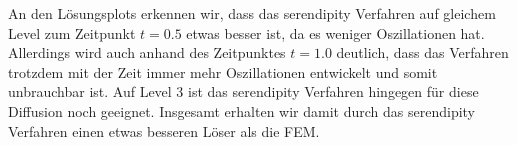 \begin{figure}[H]
	\centering
\end{figure}

An den Lösungsplots erkennen wir, dass das serendipity Verfahren auf gleichem Level zum Zeitpunkt $t=0.5$ etwas besser ist, da es weniger Oszillationen hat. Allerdings wird auch anhand des Zeitpunktes $t=1.0$ deutlich, dass das Verfahren trotzdem mit der Zeit immer mehr Oszillationen entwickelt und somit unbrauchbar ist.
Auf Level 3 ist das serendipity Verfahren hingegen für diese Diffusion noch geeignet. Insgesamt erhalten wir damit durch das serendipity Verfahren einen etwas besseren Löser als die FEM.



